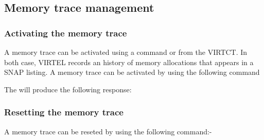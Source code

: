 \documentclass[letterpaper,10pt,english]{sphinxmanual}
\begin{document}
\ignorespaces 

\subsection{Memory trace management}
\label{\detokenize{audit_operations_ and_performance:memory-trace-management}}\label{\detokenize{audit_operations_ and_performance:index-41}}

\subsubsection{Activating the memory trace}
\label{\detokenize{audit_operations_ and_performance:activating-the-memory-trace}}
A memory trace can be activated using a command or from the VIRTCT. In both case, VIRTEL records an history of memory allocations that appears in a SNAP listing. A memory trace can be activated by using the following command

\begin{sphinxVerbatim}[commandchars=\\\{\}]
\end{sphinxVerbatim}

The will produce the following response:

\begin{sphinxVerbatim}[commandchars=\\\{\}]
 
   
          
\end{sphinxVerbatim}


\subsubsection{Resetting the memory trace}
\label{\detokenize{audit_operations_ and_performance:resetting-the-memory-trace}}
A memory trace can be reseted by using the following command:-

\begin{sphinxVerbatim}[commandchars=\\\{\}]
\end{sphinxVerbatim}
\end{document}
